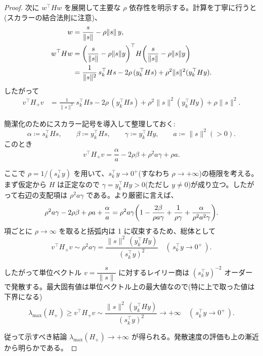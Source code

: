 \documentclass[a4paper, 10pt, dvipdfmx,draft]{article}
\newcommand{\defeq}{\coloneqq}
\begin{document}
\begin{proof}
    次に \(w^\top H w\) を展開して主要な \(\rho\) 依存性を明示する。計算を丁寧に行うと(スカラーの結合法則に注意)、
    \[
        \begin{aligned}
            w          & = \frac{s}{\|s\|} - \rho \|s\|\, y,         \\
            w^\top H w & = \qty(\frac{s}{\|s\|} - \rho \|s\| y)^\top
            H \qty(\frac{s}{\|s\|} - \rho \|s\| y)                   \\
                       & = \frac{1}{\|s\|^2}\, s_k^\top H s
            -2\rho\, (y_k^\top H s)
            + \rho^2 \|s\|^2 (y_k^\top H y).
        \end{aligned}
    \]
    したがって
    \[
        \begin{aligned}
            v^\top H_{+} v
             & = \frac{1}{\|s\|^2}\, s_k^\top H s
            -2\rho\, (y_k^\top H s)
            + \rho^2 \|s\|^2 (y_k^\top H y)
            + \rho \|s\|^2.
        \end{aligned}
    \]

    簡潔化のためにスカラー記号を導入して整理しておく:
    \begin{equation}\label{eq:scalar_notation}
        \alpha  \defeq  s_k^\top H s,\qquad \beta  \defeq  y_k^\top H s,\qquad \gamma  \defeq  y_k^\top H y,\qquad a \defeq \|s\|^2(>0).
    \end{equation}
    このとき
    \begin{equation}\label{eq:v_H_v_form}
        v^\top H_{+} v
        = \frac{\alpha}{a} - 2\rho \beta + \rho^2 a \gamma + \rho a.
    \end{equation}

    ここで \(\rho = 1/(s_k^\top y)\) を用いて、\(s_k^\top y\to 0^+\)(すなわち \(\rho\to+\infty\))の極限を考える。まず仮定から \(H\) は正定なので \(\gamma = y_k^\top H y>0\)(ただし \(y\neq0\))が成り立つ。したがって右辺の支配項は \(\rho^2 a \gamma\) である。より厳密に言えば、
    \[
        \rho^2 a \gamma - 2\rho \beta + \rho a + \frac{\alpha}{a}
        = \rho^2 a \gamma \qty( 1 - \frac{2\beta}{\rho a \gamma} + \frac{1}{\rho \gamma} + \frac{\alpha}{\rho^2 a^2 \gamma} ).
    \]
    項ごとに \(\rho\to\infty\) を取ると括弧内は 1 に収束するため、総体として
    \[
        v^\top H_{+} v \sim \rho^2 a \gamma
        = \frac{\|s\|^2\, (y_k^\top H y)}{(s_k^\top y)^2}
        \quad (\,s_k^\top y\to 0^+\,).
    \]

    したがって単位ベクトル \(v=\dfrac{s}{\|s\|}\) に対するレイリー商は \((s_k^\top y)^{-2}\) オーダーで発散する。最大固有値は単位ベクトル上の最大値なので(特に上で取った値は下界になる)
    \[
        \lambda_{\max}(H_{+}) \ge v^\top H_{+} v \sim \frac{\|s\|^2\, (y_k^\top H y)}{(s_k^\top y)^2} \to +\infty
        \quad(\,s_k^\top y\to 0^+\,).
    \]

    従って示すべき結論 \(\lambda_{\max}(H_{+})\to+\infty\) が得られる。発散速度の評価も上の漸近から明らかである。
\end{proof}
\end{document}
